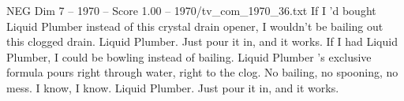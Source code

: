 \begin{textsample}{NEG Dim 7 – 1970 – Score 1.00 – 1970/tv\_com\_1970\_36.txt}  \label{ex:f7_neg_065}
If I 'd bought Liquid Plumber instead of this crystal drain opener, I wouldn't be bailing out this clogged drain.
Liquid Plumber.
Just pour it in, and it works.
If I had Liquid Plumber, I could be bowling instead of bailing.
Liquid Plumber 's exclusive formula pours right through water, right to the clog.
No bailing, no spooning, no mess.
I know, I know.
Liquid Plumber.
Just pour it in, and it works.

\end{textsample}

